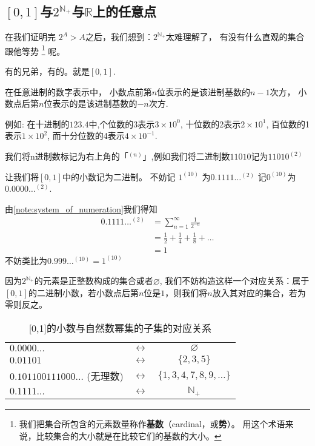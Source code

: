 \documentclass[UTF8]{mathrep}
\begin{document}
\subsection{
	\texorpdfstring{$\left[ 0, 1 \right]$与$2^{\mathbb{N}_+} $与$\mathbb{R}$上的任意点}{[0,1]与2\^N+与R上的任意点}
}
在我们证明完 $2^{A}>A$之后，我们想到：$2^{\mathbb{N}_+} $太难理解了，
有没有什么直观的集合跟他等势
\footnote{我们把集合所包含的元素数量称作\textbf{基数}（cardinal，或\textbf{势}）。
	用这个术语来说，比较集合的大小就是在比较它们的基数的大小。}
呢。

有的兄弟，有的。就是$\left[0,1\right]$.

\begin{note}[任意进制的数字表述] \label{note:system_of_numeration}
	在任意进制的数字表示中，
	小数点前第$n$位表示的是该进制基数的$n-1$次方，
	小数点后第$n$位表示的是该进制基数的$-n$次方.

	例如: 在十进制的$123.4$中,个位数的3表示$3 \times 10^{0} $,
	十位数的2表示$2 \times 10^{1} $,
	百位数的1表示$1 \times 10^{2} $,
	而十分位数的4表示$4 \times 10^{-1} $.

	我们将n进制数标记为右上角的「$^{(n)}$」,例如我们将二进制数$11010$记为$11010^{(2)}$
\end{note}

让我们将$\left[ 0, 1 \right]$中的小数记为二进制。
不妨记 $1^{(10)} $ 为$0.1111\ldots ^{(2)} $
记$0^{(10)} $为 $0.0000\ldots ^{(2)} $.

\begin{note}[$0.1111\ldots ^{(2)}  $等于$1^{(10)}$]
	由\cref{note:system_of_numeration}我们得知
	\begin{align*}
		0.1111\ldots ^{(2)} & = \sum_{n=1}^{\infty} \frac{1}{2^{-n}}          \\
		                    & = \frac{1}{2}+\frac{1}{4} +\frac{1}{8} + \ldots \\
		                    & = 1
	\end{align*}
	不妨类比为$0.999\ldots ^{(10)} = 1 ^{(10)} $
\end{note}

因为$2^{\mathbb{N}_+} $的元素是正整数构成的集合或者$\varnothing$,
我们不妨构造这样一个对应关系：属于$\left[0,1\right]$的二进制小数，若小数点后第$n$位是$1$，则我们将$n$放入其对应的集合，若为零则反之。

\begin{table}
	\begin{center}
		\begin{tabular}{lcc}
			\toprule
			$0.0000\ldots $               & $\leftrightarrow$ & $\varnothing$               \\
			$0.01101$                     & $\leftrightarrow$ & $\{2,3,5\}$                 \\
			$0.101100111000\ldots $ (无理数) & $\leftrightarrow$ & $\{1,3,4,7,8,9,\ldots \}  $ \\
			$0.1111\ldots $               & $\leftrightarrow$ & $\mathbb{N}_+$              \\
			\bottomrule
		\end{tabular}
		\caption{[0,1]的小数与自然数幂集的子集的对应关系}
		\label{tbl:01to2N}
	\end{center}
\end{table}
\end{document}

